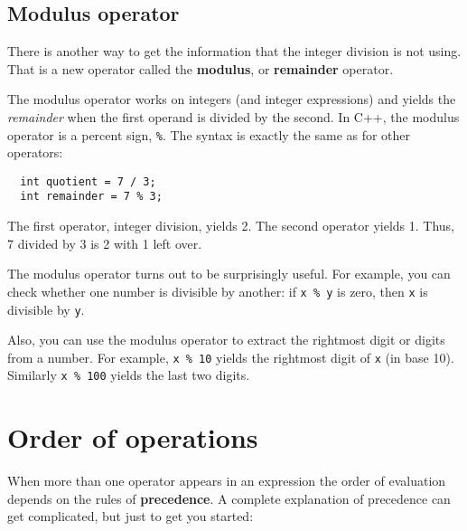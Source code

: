 \subsection{Modulus operator}
\label{modulus}
There is another way to get the information that the integer division is not using. That is a new operator called the {\bf modulus}, or {\bf remainder} operator.

The modulus operator works on integers (and integer expressions)
and yields the {\em remainder} when the first operand is divided
by the second.  In C++, the modulus operator is a percent sign,
{\tt \%}.  The syntax is exactly the same as for other operators:

\begin{verbatim}
  int quotient = 7 / 3;
  int remainder = 7 % 3;
\end{verbatim}
%
The first operator, integer division, yields 2.  The second
operator yields 1.  Thus, 7 divided by 3 is 2 with 1 left over.

The modulus operator turns out to be surprisingly useful.  For
example, you can check whether one number is divisible by
another: if {\tt x \% y} is zero, then {\tt x} is divisible
by {\tt y}.

Also, you can use the modulus operator to extract the rightmost
digit or digits from a number.  For example, {\tt x \% 10} yields
the rightmost digit of {\tt x} (in base 10).  Similarly
{\tt x \% 100} yields the last two digits.

\section{Order of operations}

When more than one operator appears in an expression the order
of evaluation depends on the rules of {\bf precedence}.  A
complete explanation of precedence can get complicated, but
just to get you started:


